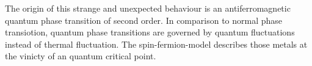 The origin of this strange and unexpected behaviour is an antiferromagnetic quantum phase transition of second order.
In comparison to normal phase transiotion, quantum phase transitions are governed by quantum fluctuations instead of thermal fluctuation.
The spin-fermion-model describes those metals at the vinicty of an quantum critical point.


































